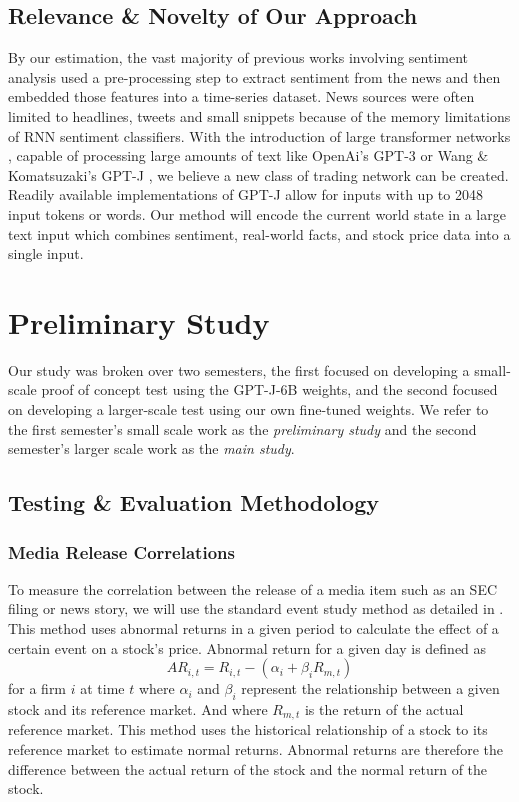 \documentclass[conference]{IEEEtran}
\begin{document}
\subsection{Relevance \& Novelty of Our Approach}
By our estimation, the vast majority of previous works involving sentiment analysis used a pre-processing step to extract sentiment from the news and then embedded those features into a time-series dataset. News sources were often limited to headlines, tweets and small snippets because of the memory limitations of RNN sentiment classifiers. With the introduction of large transformer networks \cite{Vaswani2017}, capable of processing large amounts of text like OpenAi's GPT-3 \cite{Brown2020} or Wang \& Komatsuzaki's GPT-J \cite{gpt-j}, we believe a new class of trading network can be created. Readily available implementations of GPT-J allow for inputs with up to 2048 input tokens or words. Our method will encode the current world state in a large text input which combines sentiment, real-world facts, and stock price data into a single input.

\section{Preliminary Study}
Our study was broken over two semesters, the first focused on developing a small-scale proof of concept test using the GPT-J-6B weights, and the second focused on developing a larger-scale test using our own fine-tuned weights. We refer to the first semester's small scale work as the \emph{preliminary study} and the second semester's larger scale work as the \emph{main study}.

\subsection{Testing \& Evaluation Methodology}

\subsubsection{Media Release Correlations} \label{math}
To measure the correlation between the release of a media item such as an SEC filing or news story, we will use the standard event study method as detailed in \cite{Neuhierl2010}. This method uses abnormal returns in a given period to calculate the effect of a certain event on a stock's price. Abnormal return for a given day is defined as 
\begin{equation}
    AR_{i,t}=R_{i,t}-(\alpha_i+\beta_i R_{m,t})
\end{equation}
for a firm $i$ at time $t$ where $\alpha_i$ and $\beta_i$ represent the relationship between a given stock and its reference market. And where $R_{m,t}$ is the return of the actual reference market. This method uses the historical relationship of a stock to its reference market to estimate normal returns. Abnormal returns are therefore the difference between the actual return of the stock and the normal return of the stock. 
\end{document}
